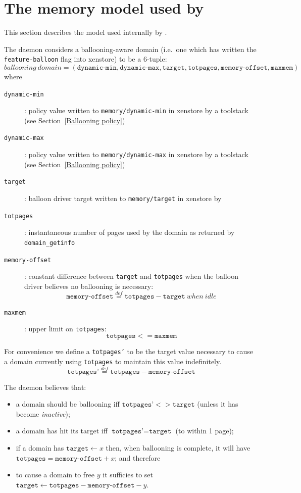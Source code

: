\documentclass{article}
\newcommand{\eqdef}{\stackrel{def}{=}}
\begin{document}
\section{The memory model used by \squeezed{}}
\label{memory model}
This section describes the model used internally by \squeezed{}.

The \squeezed{} daemon considers a ballooning-aware domain (i.e.\ one which has written the \texttt{feature-balloon} flag into xenstore) to be a 6-tuple:
\[
\mathit{ballooning~domain} = (\texttt{dynamic-min}, \texttt{dynamic-max}, \texttt{target}, \texttt{totpages}, \texttt{memory-offset}, \texttt{maxmem})
\]
where
\begin{description}
\item[\texttt{dynamic-min}]: policy value written to \texttt{memory/dynamic-min} in xenstore by a toolstack (see Section~\ref{Ballooning policy})
\item[\texttt{dynamic-max}]: policy value written to \texttt{memory/dynamic-max} in xenstore by a toolstack (see Section~\ref{Ballooning policy})
\item[\texttt{target}]: balloon driver target written to \texttt{memory/target} in xenstore by \squeezed{}
\item[\texttt{totpages}]: instantaneous number of pages used by the domain as returned by \texttt{domain\_getinfo}
\item[\texttt{memory-offset}]: constant difference between \texttt{target} and \texttt{totpages} when the balloon driver believes no ballooning is necessary:
\[
\texttt{memory-offset} \eqdef \texttt{totpages} - \texttt{target} \mathit{~when~idle}
\]
\item[\texttt{maxmem}]: upper limit on \texttt{totpages}:
\[
\texttt{totpages} <= \texttt{maxmem}
\]
\end{description}
For convenience we define a \texttt{totpages'} to be the target value necessary to cause a domain currently using \texttt{totpages} to maintain this value indefinitely.
\[
\texttt{totpages'} \eqdef \texttt{totpages} - \texttt{memory-offset}
\]

The \squeezed{} daemon believes that:
\begin{itemize}
\item a domain should be ballooning iff $\texttt{totpages'} <> \texttt{target}$ (unless it has become {\em inactive});
\item a domain has hit its target iff $\texttt{totpages'} = \texttt{target}$ (to within 1 page);
\item if a domain has $\texttt{target}\leftarrow x$ then, when ballooning is complete, it will have $\texttt{totpages}=\texttt{memory-offset}+x$; and therefore
\item to cause a domain to free $y$ it sufficies to set $\texttt{target}\leftarrow\texttt{totpages}-\texttt{memory-offset}-y$.
\end{itemize}
\end{document}
